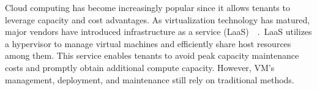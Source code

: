 











Cloud computing has become increasingly popular since it allows tenants to leverage capacity and cost advantages. As virtualization technology has matured, major vendors have introduced infrastructure as a 
service (LaaS)~\cite*{8031522}~\cite*{10.1145/2767181}.~\acrshort{LaaS} utilizes a hypervisor to manage 
virtual machines and efficiently share host resources among them. This service enables tenants to avoid peak capacity maintenance costs and promptly obtain additional compute capacity. However, VM's management, deployment, and maintenance still rely on traditional methods.
 
